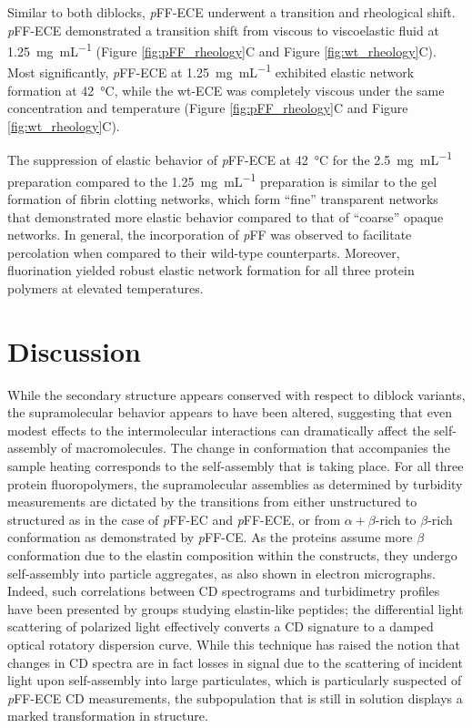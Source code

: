 \begin{refsection}
Similar to both diblocks, \emph{p}FF-ECE underwent a transition and rheological shift.
\emph{p}FF-ECE demonstrated a transition shift from viscous to viscoelastic fluid at
\SI{1.25}{\mg\per\mL} (Figure \ref{fig:pFF_rheology}C and Figure
\ref{fig:wt_rheology}C). Most significantly, \emph{p}FF-ECE at
\SI{1.25}{\mg\per\mL} exhibited elastic network formation at
\SI{42}{\celsius}, while the wt-ECE was completely viscous under the same
concentration and temperature (Figure \ref{fig:pFF_rheology}C and Figure
\ref{fig:wt_rheology}C).

The suppression of elastic behavior of \emph{p}FF-ECE at \SI{42}{\celsius} for the
\SI{2.5}{\mg\per\mL} preparation compared to the \SI{1.25}{\mg\per\mL}
preparation is similar to the gel formation of fibrin clotting networks, which
form ``fine'' transparent networks that demonstrated more elastic behavior
compared to that of ``coarse'' opaque networks.\cite{Clark1987} In general, the
incorporation of \emph{p}FF was observed to facilitate percolation when compared to
their wild-type counterparts. Moreover, fluorination yielded robust elastic
network formation for all three protein polymers at elevated temperatures. 

\section{Discussion}

While the secondary structure appears conserved with respect to diblock
variants, the supramolecular behavior appears to have been altered, suggesting
that even modest effects to the intermolecular interactions can dramatically
affect the self-assembly of macromolecules.\cite{URRY1974} The change in
conformation that accompanies the sample heating corresponds to the
self-assembly that is taking place. For all three protein fluoropolymers, the
supramolecular assemblies as determined by turbidity measurements are dictated
by the transitions from either unstructured to structured as in the case of
\emph{p}FF-EC and \emph{p}FF-ECE, or from ${\alpha+\beta}$-rich to ${\beta}$-rich conformation
as demonstrated by \emph{p}FF-CE. As the proteins assume more ${\beta}$ conformation
due to the elastin composition within the constructs, they undergo self-assembly
into particle aggregates, as also shown in electron micrographs. Indeed, such correlations between CD spectrograms and
turbidimetry profiles have been presented by groups studying elastin-like
peptides; the differential light scattering of polarized light effectively
converts a CD signature to a damped optical rotatory dispersion curve. While
this technique has raised the notion that changes in CD spectra are in fact
losses in signal due to the scattering of incident light upon self-assembly into
large particulates, which is particularly suspected of \emph{p}FF-ECE CD
measurements, the subpopulation that is still in solution displays a marked
transformation in structure.


\end{refsection}
